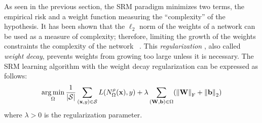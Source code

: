 As seen in the previous section, the SRM paradigm minimizes two terms, the empirical risk and a weight function measuring the ``complexity'' of the hypothesis.
It has been shown that the $\ell_2$ norm of the weights of a network can be used as a measure of complexity; therefore, limiting the growth of the weights constraints the complexity of the network ~\cite{hinton1987learning}.
This \emph{regularization} \cite{tikhonov1977solutions,krogh1992simple}, also called \emph{weight decay}, prevents weights from growing too large unless it is necessary.
The SRM learning algorithm with the weight decay regularization can be expressed as follows:
\begin{equation}
  \argmin_{\weights} \frac{1}{|\mathcal{S}|} \sum_{(\xvec, y) \in \mathcal{S}} L(N^\act_\weights(\xvec), y) + \lambda \sum_{(\Wmat, \bvec) \in \weights} \left( \norm{\Wmat}_\mathrm{F} + \norm{\bvec}_\mathrm{2} \right)
\end{equation}
where $\lambda > 0$ is the regularization parameter.



